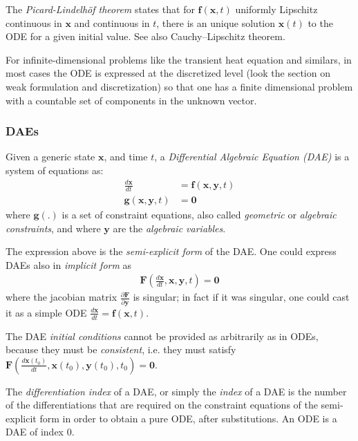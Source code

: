 \documentclass{digitaldynamics}
\def\vect#1{\bm{#1}}
\begin{document}
The \textit{Picard-Lindelh\"{o}f theorem} states that for $\vect{f}\left( \vect{x}, t\right)$ uniformly Lipschitz continuous in $\vect{x}$ and continuous in $t$, there is an unique solution $\vect{x}(t)$ to the ODE for a given initial value. See also Cauchy–Lipschitz theorem.

For infinite-dimensional problems like the transient heat equation and similars, in most cases the ODE is expressed 
at the discretized level (look the section on weak formulation and discretization) 
so that one has a finite dimensional problem with a countable set of components in the unknown vector.



\subsubsection{DAEs}

Given a generic state $\vect{x}$, and time $t$, a \textit{Differential Algebraic Equation (DAE)} is a system of equations as:
%
\begin{align}
  \frac{d\vect{\vect{x}}}{dt}  &= \vect{f} \left( \vect{x}, \vect{y}, t\right) \\
	\vect{g} \left( \vect{x}, \vect{y}, t\right) &= \vect{0}
\end{align}
%
where $\vect{g}(.)$ is a set of constraint equations, also called \textit{geometric} or \textit{algebraic constraints}, and where $\vect{y}$ are the \textit{algebraic variables}.

The expression above is the \textit{semi-explicit form} of the DAE. One could express DAEs also in \textit{implicit form} as 
%
\begin{align}
\vect{F} \left( \frac{d\vect{\vect{x}}}{dt}, \vect{x}, \vect{y}, t\right) = \vect{0}
\end{align}
%
where the jacobian matrix $\frac{\partial \vect{F}}{\partial \vect{y}}$ is singular; in fact if it was singular, one could cast it as a simple ODE $\frac{d\vect{\vect{x}}}{dt}  = \vect{f} \left(\vect{x}, t\right)$.

The DAE \textit{initial conditions} cannot be provided as arbitrarily as in ODEs, because they must be \textit{consistent}, i.e. they must satisfy $\vect{F} \left( \frac{d\vect{\vect{x}}(t_0)}{dt}, \vect{x}(t_0), \vect{y}(t_0), t_0 \right) = \vect{0}$.

The \textit{differentiation index} of a DAE, or simply the \textit{index} of a DAE is the number of the differentiations that are required on the constraint equations of the semi-explicit form in order to obtain a pure ODE, after substitutions. An ODE is a DAE of index 0.
\end{document}
